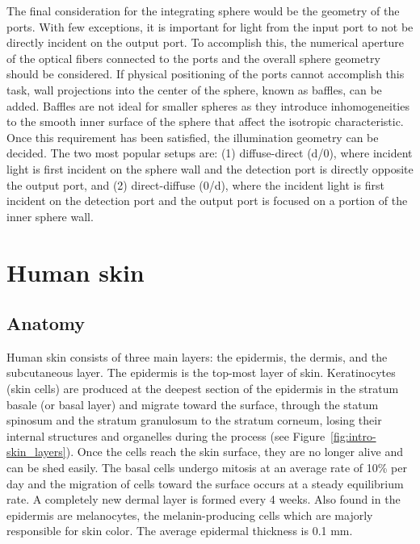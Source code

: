 The final consideration for the integrating sphere would be the geometry of the ports. With few exceptions, it is important for light from the input port to not be directly incident on the output port. To accomplish this, the numerical aperture of the optical fibers connected to the ports and the overall sphere geometry should be considered. If physical positioning of the ports cannot accomplish this task,  wall projections into the center of the sphere, known as baffles, can be added. Baffles are not ideal for smaller spheres as they introduce inhomogeneities to the smooth inner surface of the sphere that affect the isotropic characteristic. Once this requirement has been satisfied, the illumination geometry can be decided. The two most popular setups are: (1) diffuse-direct (d/0\degree), where incident light is first incident on the sphere wall and the detection port is directly opposite the output port, and (2) direct-diffuse (0\degree/d), where the incident light is first incident on the detection port and the output port is focused on a portion of the inner sphere wall.\cite{Springsteen1998}

\section{Human skin}
\label{sec:skin}

\subsection{Anatomy}
Human skin consists of three main layers: the epidermis, the dermis, and the subcutaneous layer.\cite{Fodor2011a} The epidermis is the top-most layer of skin. Keratinocytes (skin cells) are produced at the deepest section of the epidermis in the stratum basale (or basal layer) and migrate toward the surface, through the statum spinosum and the stratum granulosum to the stratum corneum, losing their internal structures and organelles during the process (see Figure~\ref{fig:intro-skin_layers}). Once the cells reach the skin surface, they are no longer alive and can be shed easily. The basal cells undergo mitosis at an average rate of 10\% per day\cite{McQuestion2006} and the migration of cells toward the surface occurs at a steady equilibrium rate. A completely new dermal layer is formed every 4 weeks. Also found in the epidermis are melanocytes, the melanin-producing cells which are majorly responsible for skin color. The average epidermal thickness is 0.1 mm.\cite{Yang2009}

